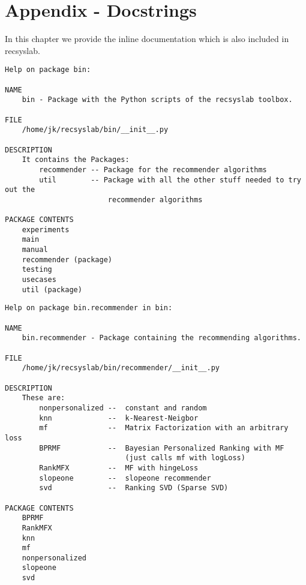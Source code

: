 \chapter{Appendix - Docstrings}
In this chapter we provide the inline documentation which is also included
in recsyslab.

\begin{lstlisting}
Help on package bin:

NAME
    bin - Package with the Python scripts of the recsyslab toolbox.

FILE
    /home/jk/recsyslab/bin/__init__.py

DESCRIPTION
    It contains the Packages:
        recommender -- Package for the recommender algorithms
        util        -- Package with all the other stuff needed to try out the
                        recommender algorithms

PACKAGE CONTENTS
    experiments
    main
    manual
    recommender (package)
    testing
    usecases
    util (package)
\end{lstlisting}

\begin{lstlisting}
Help on package bin.recommender in bin:

NAME
    bin.recommender - Package containing the recommending algorithms.

FILE
    /home/jk/recsyslab/bin/recommender/__init__.py

DESCRIPTION
    These are:
        nonpersonalized --  constant and random
        knn             --  k-Nearest-Neigbor
        mf              --  Matrix Factorization with an arbitrary loss
        BPRMF           --  Bayesian Personalized Ranking with MF
                            (just calls mf with logLoss)
        RankMFX         --  MF with hingeLoss
        slopeone        --  slopeone recommender
        svd             --  Ranking SVD (Sparse SVD)

PACKAGE CONTENTS
    BPRMF
    RankMFX
    knn
    mf
    nonpersonalized
    slopeone
    svd
\end{lstlisting}

